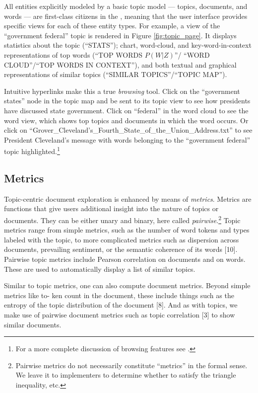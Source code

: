 \documentclass[11pt]{article}
\begin{document}
All entities explicitly modeled by a basic topic model --- topics, documents, and
words --- are first-class citizens in the \toolname{}, meaning that the user
interface provides specific views for each of these entity types. For example, a
view of the ``government federal'' topic is rendered in Figure \ref{fig:topic_page}.
It displays statistics about the topic (``STATS''); chart, word-cloud, and
key-word-in-context representations of top words (``TOP WORDS $P(W|Z)$''/
``WORD CLOUD''/``TOP WORDS IN CONTEXT''), and both textual and graphical
representations of similar topics (``SIMILAR TOPICS''/``TOPIC MAP'').

Intuitive hyperlinks make this a true \textit{browsing} tool. Click on the
``government states'' node in the topic map and be sent to its topic view to see
how presidents have discussed state government. Click on ``federal'' in the word
cloud to see the word view, which shows top topics and documents in which the
word occurs. Or click on ``Grover\_\allowbreak{}Cleveland's\_\allowbreak{}Fourth\_\allowbreak{}State\_\allowbreak{}of\_\allowbreak{}the\_\allowbreak{}Union\_\allowbreak{}Address.txt''
to see President Cleveland's message with words belonging to the ``government federal''
topic highlighted.\footnote{For a more complete discussion
of browsing features see \cite{gardner_browser_2010}.}%

\subsection{Metrics}
Topic-centric document exploration is enhanced by means of \textit{metrics}.
Metrics are functions that give users additional insight into the nature of
topics or documents. They can be either unary and binary,
here called \textit{pairwise}.\footnote{Pairwise metrics do not necessarily
constitute ``metrics'' in the formal sense. We leave it to implementers to
determine whether to satisfy the triangle inequality, etc.} Topic metrics range
from simple metrics, such as the number of word tokens and types labeled with
the topic, to more complicated metrics such as dispersion across
documents, prevailing sentiment, or the semantic coherence of its words [10]. Pairwise topic metrics%
include Pearson correlation on documents and on words. These are used to automatically
display a list of similar topics.

Similar to topic metrics, one can also compute document metrics. Beyond simple metrics like to-
ken count in the document, these include things such as the entropy of the topic distribution of
the document [8]. And as with topics, we make use of pairwise document metrics such as topic%
correlation [3] to show similar documents.%
\end{document}

